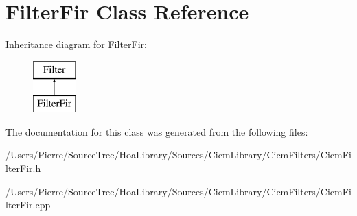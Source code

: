 \hypertarget{class_filter_fir}{\section{Filter\-Fir Class Reference}
\label{class_filter_fir}
}
Inheritance diagram for Filter\-Fir\-:\begin{figure}[H]
\begin{center}
\leavevmode
\includegraphics[height=2.000000cm]{class_filter_fir}
\end{center}
\end{figure}


The documentation for this class was generated from the following files\-:\begin{DoxyCompactItemize}
\item 
/\-Users/\-Pierre/\-Source\-Tree/\-Hoa\-Library/\-Sources/\-Cicm\-Library/\-Cicm\-Filters/Cicm\-Filter\-Fir.\-h\item 
/\-Users/\-Pierre/\-Source\-Tree/\-Hoa\-Library/\-Sources/\-Cicm\-Library/\-Cicm\-Filters/Cicm\-Filter\-Fir.\-cpp\end{DoxyCompactItemize}
